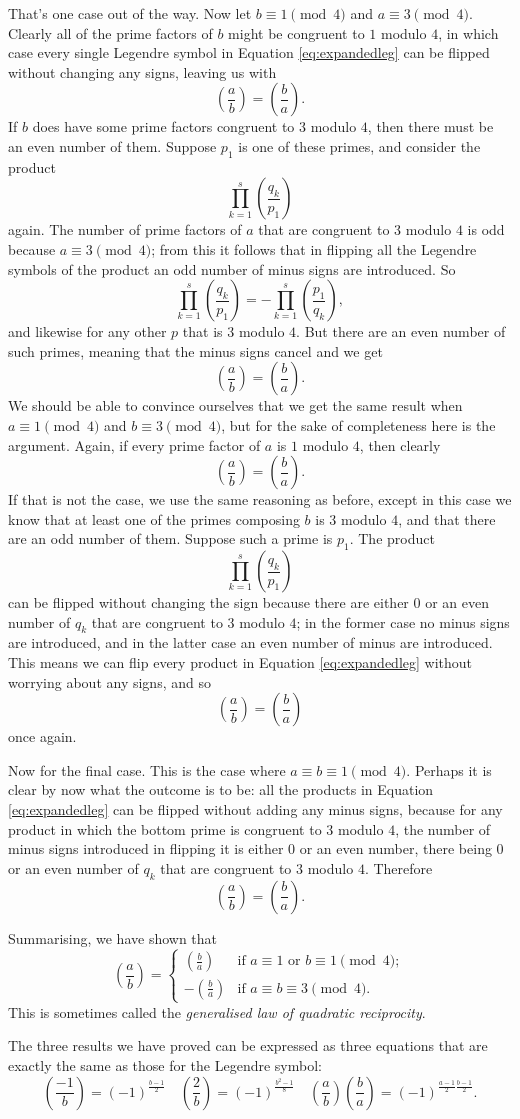 \documentclass[a4paper]{article}
\newcommand{\leg}[2]{\left(\frac{#1}{#2}\right)}
\begin{document}
That's one case out of the way. Now let \(b\equiv1\pmod{4}\) and
\(a\equiv3\pmod{4}\). Clearly all of the prime factors of \(b\)
might be congruent to \(1\) modulo \(4\), in which case every single
Legendre symbol in Equation \eqref{eq:expandedleg}
can be flipped without changing any signs, 
leaving us with 
\[\leg{a}{b}=\leg{b}{a}.\]
If \(b\) does have some prime factors congruent to \(3\) modulo \(4\),
then there must be an even number of them. Suppose \(p_1\)
is one of these primes, and consider the product
\[\prod_{k=1}^s\leg{q_k}{p_1}\]
again.
The number of prime factors of \(a\) that are congruent to \(3\)
modulo \(4\) is odd because \(a\equiv3\pmod{4}\); from this
it follows that in flipping all the Legendre symbols
of the product an odd number of minus signs are introduced.
So
\[\prod_{k=1}^s\leg{q_k}{p_1}=-\prod_{k=1}^s\leg{p_1}{q_k},\]
and likewise for any other \(p\) that is \(3\) modulo \(4\).
But there are an even number of such primes, meaning
that the minus signs cancel and we get
\[\leg{a}{b}=\leg{b}{a}.\]
We should be able to convince ourselves that we get
the same result when \(a\equiv1\pmod{4}\) and \(b\equiv3\pmod{4}\),
but for the sake of completeness here is the argument.
Again, if every prime factor of \(a\) is \(1\) modulo \(4\),
then clearly \[\leg{a}{b}=\leg{b}{a}.\]
If that is not the case, we use the same reasoning as before,
except in this case we know that at least one of the primes composing
\(b\) is \(3\) modulo \(4\), and that there are an odd number
of them. Suppose such a prime is \(p_1\). The product 
\[\prod_{k=1}^s\leg{q_k}{p_1}\]
can be flipped without changing the sign because there are either
\(0\) or an even number of \(q_k\) that are congruent to \(3\) modulo \(4\);
in the former case no minus signs are introduced, and in the latter
case an even number of minus are introduced.
This means we can flip every product in Equation \eqref{eq:expandedleg}
without worrying about any signs, and so
\[\leg{a}{b}=\leg{b}{a}\] once again.

Now for the final case. This is the case where \(a\equiv b\equiv1\pmod{4}.\)
Perhaps it is clear by now what the outcome is to be: all
the products in Equation \eqref{eq:expandedleg} can be flipped
without adding any minus signs, because for any product in
which the bottom prime is congruent to \(3\) modulo \(4\), the number
of minus signs introduced in flipping it is either \(0\) or 
an even number, there being \(0\) or an even number of \(q_k\) 
that are congruent to \(3\) modulo \(4\). Therefore
\[\leg{a}{b}=\leg{b}{a}.\]

Summarising, we have shown that
\[
	\leg{a}{b}=
	\begin{cases}
		\leg{b}{a}&\text{if }a\equiv1\text{ or }
		b\equiv1\pmod{4};\\
		-\leg{b}{a}&\text{if }a\equiv b\equiv3\pmod{4}.
	\end{cases}
\]
This is sometimes called the \emph{generalised law of quadratic
reciprocity}. 

The three results we have proved can be expressed as three equations
that are exactly the same as those for the Legendre symbol:
\[
	\leg{-1}{b}=(-1)^{\frac{b-1}{2}}\quad\leg{2}{b}=(-1)^{\frac{b^2-1}{8}}\quad
	\leg{a}{b}\leg{b}{a}=(-1)^{\frac{a-1}{2}\frac{b-1}{2}}.
\]
\end{document}
